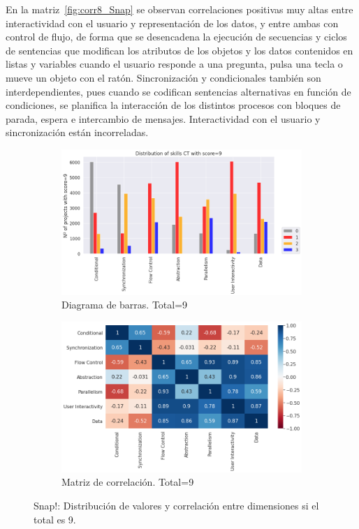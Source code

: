 \documentclass[a4paper, 12pt]{book}
\begin{document}
En la matriz~\ref{fig:corr8_Snap} se observan correlaciones positivas muy altas entre interactividad con el usuario y representación de los datos, y entre ambas con control de flujo, de forma que se desencadena la ejecución de secuencias y ciclos de sentencias que modifican los atributos de los objetos y los datos contenidos en listas y variables cuando el usuario responde a una pregunta, pulsa una tecla o mueve un objeto con el ratón. Sincronización y condicionales también son interdependientes, pues cuando se codifican sentencias alternativas en función de condiciones, se planifica la interacción de los distintos procesos con bloques de parada, espera e intercambio de mensajes. Interactividad con el usuario y sincronización están incorreladas.

\begin{figure}
    \centering
    \begin{subfigure}[h]{.49\textwidth} 
        \includegraphics[width=\textwidth]{img/distribucion_9_Snap}
        \caption{Diagrama de barras. Total=9}
        \label{fig:total9_Snap}
    \end{subfigure}       
    \begin{subfigure}[h]{.49\textwidth} 
        \includegraphics[width=\textwidth]{img/corr_9_Snap}
        \caption{Matriz de correlación. Total=9}
        \label{fig:corr9_Snap}
    \end{subfigure}
    \caption{Snap!: Distribución de valores y correlación entre dimensiones si el total es 9.}
\end{figure}
  
\end{document}
